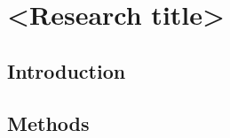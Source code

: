 \chapter{<Research title>}
\label{ch:<id>}


\section{Introduction}
\label{sec:<id>-introduction}

\section{Methods}
\label{sec:<id>-methods}

